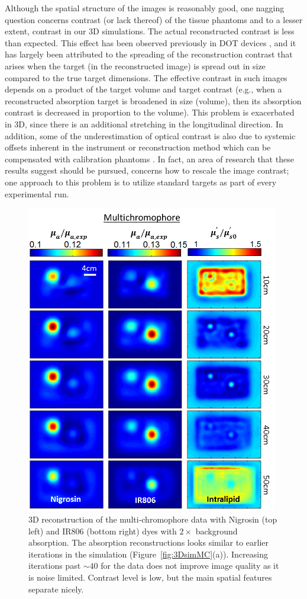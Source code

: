 Although the spatial structure of the images is reasonably good, one nagging question concerns contrast (or lack thereof) of the tissue phantoms and to a lesser extent, contrast in our 3D simulations.  The actual reconstructed contrast is less than expected. This effect has been observed previously in DOT devices \cite{Pogue1997,McBride1999,Culver2003}, and it has largely been attributed to the spreading of the reconstruction contrast that arises when the target (in the reconstructed image) is spread out in size compared to the true target dimensions. The effective contrast in such images depends on a product of the target volume and target contrast (e.g., when a reconstructed absorption target is broadened in size (volume), then its absorption contrast is decreased in proportion to the volume). This problem is exacerbated in 3D, since there is an additional stretching in the longitudinal direction.  In addition, some of the underestimation of optical contrast is also due to systemic offsets inherent in the instrument or reconstruction method which can be compensated with calibration phantoms \cite{Jiang2003}. In fact, an area of research that these results suggest should be pursued, concerns how to rescale the image contrast; one approach to this problem is to utilize standard targets as part of every experimental run.
\floatbarrier
\begin{figure}[htp]
\centering
\includegraphics[width=11cm]{./figures/4_Gen3/3DMC.png}
\caption[3D reconstruction of the multi-chromophore data with Nigrosin (top left) and IR806 (bottom right) dyes with $2\times$ background absorption]{3D reconstruction of the multi-chromophore data with Nigrosin (top left) and IR806 (bottom right) dyes with $2\times$ background absorption. The absorption reconstructions looks similar to earlier iterations in the simulation (Figure~\ref{fig:3DsimMC}(a)). Increasing iterations past $\sim40$ for the data does not improve image quality as it is noise limited. Contrast level is low, but the main spatial features separate nicely.}
\label{fig:3DMC}
\end{figure}
